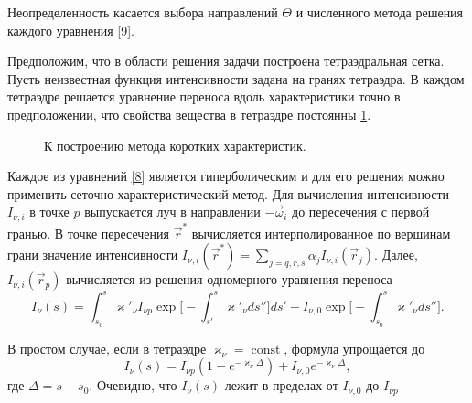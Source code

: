Неопределенность касается выбора направлений $\Theta$ и численного метода решения каждого уравнения \eqref{9}.

Предположим, что в области решения задачи построена тетраэдральная сетка.
Пусть неизвестная функция интенсивности задана на гранях тетраэдра. В каждом тетраэдре решается уравнение переноса вдоль характеристики точно в предположении, что свойства вещества в тетраэдре постоянны \ref{fig:3}. 

\begin{figure}[ht!]
\caption{К построению метода коротких характеристик.}
\label{fig:3}
\end{figure}

Каждое из уравнений \eqref{8} является гиперболическим и для его решения можно применить сеточно-характеристический метод. Для вычисления интенсивности $I_{\nu,i}$ в точке $p$ выпускается луч в направлении $-\vec\omega_i$ до пересечения с первой гранью. В точке пересечения $\vec r^*$ вычисляется интерполированное по вершинам грани значение интенсивности $I_{\nu, i} (\vec r^*) = \sum_{j = q,r,s} \alpha_jI_{\nu, i}(\vec r_j)$. Далее, $I_{\nu, i} (\vec r_p)$ вычисляется из решения одномерного уравнения переноса   
\begin {equation}
I_{\nu}(s) = \int_{s_0}^s\varkappa'_{\nu}I_{\nu p} \exp\Big[-\int_{s'}^s\varkappa'_{\nu}ds''\Big]ds' + I_{\nu,0} \exp\Big[-\int_{s_0}^s \varkappa'_{\nu}ds''\Big].
\end {equation}

В простом случае, если в тетраэдре $\varkappa_\nu = \operatorname{const}$, формула упрощается до 
\begin {equation}
I_\nu (s) = I_{\nu p} \left(1 - e^{-\varkappa_\nu \Delta}\right) + I_{\nu,0}e^{-\varkappa_\nu \Delta},
\end {equation}
где $\Delta = s - s_0$. Очевидно, что $I_\nu(s)$ лежит в пределах от $I_{\nu, 0}$ до $I_{\nu p}$
